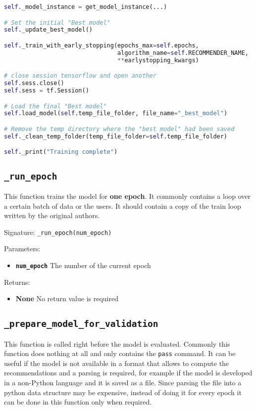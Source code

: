 \begin{lstlisting}[language=Python]
self._model_instance = get_model_instance(...)

# Set the initial "Best model"
self._update_best_model()

self._train_with_early_stopping(epochs_max=self.epochs, 
                                algorithm_name=self.RECOMMENDER_NAME,
                                **earlystopping_kwargs)

# close session tensorflow and open another
self.sess.close()
self.sess = tf.Session()

# Load the final "Best model"
self.load_model(self.temp_file_folder, file_name="_best_model")

# Remove the temp directory where the "best model" had been saved
self._clean_temp_folder(temp_file_folder=self.temp_file_folder)

self._print("Training complete")
\end{lstlisting}





\subsection{\texttt{\_run\_epoch}}
This function trains the model for \textbf{one epoch}. It commonly contains a loop over a certain batch of data or the users. It should contain a copy of the train loop written by the original authors. 

Signature: \texttt{\_run\_epoch(num\_epoch)}

Parameters:
\begin{itemize}
    \item \textbf{\texttt{num\_epoch}} The number of the current epoch
\end{itemize}

Returns:
\begin{itemize}
    \item \textbf{None} No return value is required
\end{itemize}





\subsection{\texttt{\_prepare\_model\_for\_validation}}
This function is called right before the model is evaluated. Commonly this function does nothing at all and only contains the \texttt{pass} command. It can be useful if the model is not available in a format that allows to compute the recommendations and a parsing is required, for example if the model is developed in a non-Python language and it is saved as a file. Since parsing the file into a python data structure may be expensive, instead of doing it for every epoch it can be done in this function only when required. 


